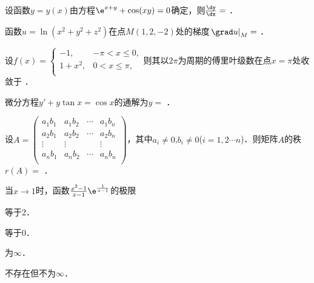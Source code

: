\documentclass[plain,noanswer,medmath]{../../template/jnuexam}
\begin{document}




\begin{problem}
设函数$y = y(x)$由方程$\e^{x + y} + \cos(xy) = 0$确定，则$\frac{\dy}{\dx} =$ \fillin{}．
\end{problem}


\begin{problem}
函数$u = \ln(x^2 + y^2 + z^2)$在点$M(1,2, -2)$处的梯度$\left.\grad u\right|_M =$ \fillin{}．
\end{problem}


\begin{problem}
设$f(x) = \begin{cases}
      -1, & - \pi < x \le 0, \\
 1 + x^2, & 0 < x \le \pi , \\
\end{cases}$则其以$2\pi$为周期的傅里叶级数在点$x = \pi$处收敛于 \fillin{}．
\end{problem}


\begin{problem}
微分方程$y' + y\tan x = \cos x$的通解为$y =$ \fillin{}．
\end{problem}


\begin{problem}
设$A = \begin{pmatrix}
  a_1b_1 & a_1b_2 & \cdots & a_1b_n \\
  a_2b_1 & a_2b_2 & \cdots & a_2b_n \\
 \vdots & \vdots &        & \vdots \\
  a_nb_1 & a_nb_2 & \cdots & a_nb_n \\
\end{pmatrix}$，其中$a_i \ne 0$,$b_i \ne 0$($i = 1,2 \cdots n$)．则矩阵$A$的秩$r(A)=$ \fillin{}．
\end{problem}




\begin{problem}
当$x \to 1$时，函数$\frac{x^2 - 1}{x - 1}\e^{\frac{1}{x - 1}}$的极限 \pickout{}
\begin{abcd}
\item 等于$2$．     
\item 等于$0$．     
\item 为$\infty$．     
\item 不存在但不为$\infty$．
\end{abcd}
\end{problem}
\end{document}
